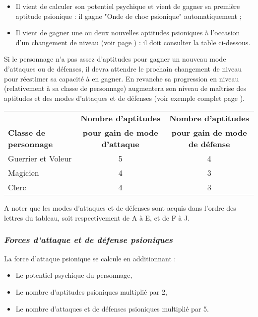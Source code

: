 \begin{itemize}
\item Il vient de calculer son potentiel psychique et vient de gagner sa première aptitude psionique : il gagne "Onde de choc psionique" automatiquement ;
\item Il vient de gagner une ou deux nouvelles aptitudes psioniques à l'occasion d'un changement de niveau (voir page \pageref{aptitudes-gain}) : il doit consulter la table ci-dessous.
\end{itemize}

\bigskip

 Si le personnage n'a pas assez d'aptitudes pour gagner un nouveau mode d'attaques ou de défenses, il devra attendre le prochain changement de niveau pour réestimer sa capacité à en gagner. En revanche sa progression en niveau (relativement à sa classe de personnage) augmentera son niveau de maîtrise des aptitudes et des modes d'attaques et de défenses (voir exemple complet page \pageref{exemple-complet}).


\bigskip

\begin{tabular}{lcc}
& \textbf{Nombre d'aptitudes} & \textbf{Nombre d'aptitudes} \\
\textbf{Classe de personnage} & \textbf{pour gain de mode d'attaque} & \textbf{pour gain de mode de défense} \\
Guerrier et Voleur & 5 & 4 \\
Magicien & 4 & 3 \\
Clerc & 4 & 3 \\
\end{tabular}

\bigskip

A noter que les modes d'attaques et de défenses sont acquis dans l'ordre des lettres du tableau, soit respectivement de A à E, et de F à J.

\subsubsection*{\textit{Forces d'attaque et de défense psioniques}}

La force d'attaque psionique se calcule en additionnant :

\bigskip

\begin{itemize}
\item Le potentiel psychique du personnage,
\item Le nombre d'aptitudes psioniques multiplié par 2,
\item Le nombre d'attaques et de défenses psioniques multiplié par 5.
\end{itemize}

